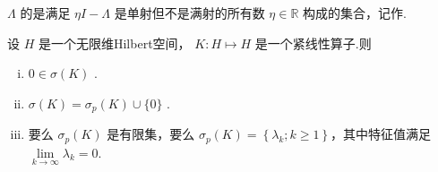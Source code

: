\begin{definition}[本质谱]
    $\Lambda$ 的是满足 ${\eta I} - \Lambda$ 是单射但不是满射的所有数 $\eta  \in  \mathbb{R}$ 构成的集合，记作.
\end{definition}





\begin{theorem}[紧算子的谱]\label{thm:compact-operator-spectrum}
设 $H$ 是一个无限维Hilbert空间， $K : H \mapsto  H$ 是一个紧线性算子.则
\begin{enumerate}[(i)]
    \item $0 \in  \sigma \left( K\right)$ .
    \item $\sigma \left( K\right)  = {\sigma }_{p}\left( K\right)  \cup  \{ 0\}$ .
    \item 要么 ${\sigma }_{p}\left( K\right)$ 是有限集，要么 ${\sigma }_{p}\left( K\right)  = \left\{  {{\lambda }_{k};k \geq  1}\right\}$，其中特征值满足 $\mathop{\lim }\limits_{{k \rightarrow  \infty }}{\lambda }_{k} = 0$.
\end{enumerate}
\end{theorem}

